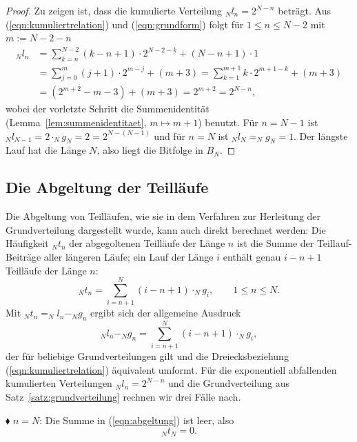 \documentclass[11pt,a4paper]{scrartcl}
\theoremstyle{plain}
\theoremstyle{definition}
\theoremstyle{remark}
\begin{document}
\begin{proof}
Zu zeigen ist, dass die kumulierte Verteilung $_Nl_n=2^{N-n}$ beträgt.
Aus (\ref{eqn:kumuliertrelation}) und (\ref{eqn:grundform}) folgt für
$1\leq n\leq N-2$ mit $m:=N-2-n$
\begin{align*}
  _Nl_n&=\sum_{k=n}^{N-2}\left(k-n+1\right)\cdot 2^{N-2-k}
  +\left(N-n+1\right)\cdot 1\\
  &=\sum_{j=0}^{m}\left(j+1\right)\cdot 2^{m-j}+\left(m+3\right)
  =\sum_{k=1}^{m+1} k\cdot 2^{m+1-k}+\left(m+3\right)\\
  &=\left(2^{m+2}-m-3\right)+\left(m+3\right)=2^{m+2}=2^{N-n},
\end{align*}
wobei der vorletzte Schritt die Summenidentität
(Lemma~\ref{lem:summenidentitaet}, $m\mapsto m+1$) benutzt. Für
$n=N-1$ ist $_Nl_{N-1}=2\cdot _Ng_N=2=2^{N-(N-1)}$ und für $n=N$ ist
$_Nl_N=_Ng_N=1$. Der längste Lauf hat die Länge $N$, also liegt die
Bitfolge in $B_N$.
\end{proof}

\subsection{Die Abgeltung der Teilläufe}

Die Abgeltung von Teilläufen, wie sie in dem Verfahren zur Herleitung
der Grundverteilung dargestellt wurde, kann auch direkt berechnet
werden: Die Häufigkeit $_Nt_n$ der abgegoltenen Teilläufe der Länge $n$
ist die Summe der Teillauf-Beiträge aller längeren Läufe; ein Lauf der
Länge $i$ enthält genau $i-n+1$ Teilläufe der Länge $n$:
\begin{equation}\label{eqn:abgeltung}
  _Nt_n=\sum_{i=n+1}^{N}\left(i-n+1\right)\cdot _Ng_i,\qquad 1\leq n\leq N.
\end{equation}
Mit $_Nt_n = _Nl_n - _Ng_n$ ergibt sich der allgemeine Ausdruck
\begin{equation}\label{eqn:abgegoltete}
  _Nl_n - _Ng_n=\sum_{i=n+1}^{N}\left(i-n+1\right)\cdot _Ng_i,
\end{equation}
der für beliebige Grundverteilungen gilt und die Dreiecksbeziehung
(\ref{eqn:kumuliertrelation}) äquivalent umformt. Für die exponentiell
abfallenden kumulierten Verteilungen $_Nl_n=2^{N-n}$ und die
Grundverteilung aus Satz~\ref{satz:grundverteilung} rechnen wir drei
Fälle nach.

\noindent$\blacklozenge$ $n=N$: Die Summe in (\ref{eqn:abgeltung}) ist
leer, also
\begin{equation}
  _Nt_N=0.
\end{equation}
\end{document}
